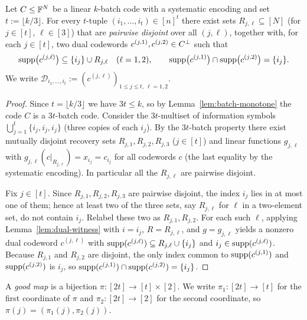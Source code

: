 \begin{lemma}
  \label{lem:dual-pairs}
  Let $C \le \mathbb{F}^N$ be a linear $k$-batch code with a systematic encoding and set
  $t := \lfloor k/3 \rfloor$. For every $t$-tuple $(i_1, \dots, i_t) \in [n]^t$
  there exist sets $R_{j,\ell} \subseteq [N]$ (for $j \in [t]$, $\ell \in [3]$)
  that are \emph{pairwise disjoint} over all $(j,\ell)$, together with, for each
  $j \in [t]$, two dual codewords $c^{(j,1)}, c^{(j,2)} \in C^{\perp}$ such
  that
  \[
    \operatorname{supp}\bigl(c^{(j,\ell)}\bigr) \subseteq \{i_j\} \cup R_{j,\ell}
      \quad(\ell = 1,2),
    \qquad
    \operatorname{supp}\bigl(c^{(j,1)}\bigr) \cap \operatorname{supp}\bigl(c^{(j,2)}\bigr) = \{i_j\}.
  \]
  We write $\mathcal{D}_{i_1, \dots, i_t} := (c^{(j,\ell)})_{1 \le j \le t,\ \ell=1,2}$.
\end{lemma}
\begin{proof}
  Since $t = \lfloor k/3 \rfloor$ we have $3t \le k$, so by
  Lemma~\ref{lem:batch-monotone} the code $C$ is a $3t$-batch code. Consider the
  $3t$-multiset of information symbols $\bigcup_{j=1}^{t} \{i_j, i_j, i_j\}$
  (three copies of each $i_j$). By the $3t$-batch property there exist mutually
  disjoint recovery sets $R_{j,1}, R_{j,2}, R_{j,3}$ ($j \in [t]$) and linear
  functions $g_{j,\ell}$ with $g_{j,\ell}(c|_{R_{j,\ell}}) = x_{i_j} = c_{i_j}$
  for all codewords $c$ (the last equality by the systematic encoding). In
  particular all the $R_{j,\ell}$ are pairwise disjoint.

  Fix $j \in [t]$. Since $R_{j,1}, R_{j,2}, R_{j,3}$ are pairwise disjoint, the
  index $i_j$ lies in at most one of them; hence at least two of the three sets,
  say $R_{j,\ell}$ for $\ell$ in a two-element set, do not contain $i_j$. Relabel
  these two as $R_{j,1}, R_{j,2}$. For each such $\ell$, applying
  Lemma~\ref{lem:dual-witness} with $i = i_j$, $R = R_{j,\ell}$, and $g =
  g_{j,\ell}$ yields a nonzero dual codeword $c^{(j,\ell)}$ with
  $\operatorname{supp}(c^{(j,\ell)}) \subseteq R_{j,\ell} \cup \{i_j\}$ and
  $i_j \in \operatorname{supp}(c^{(j,\ell)})$. Because $R_{j,1}$ and $R_{j,2}$ are disjoint,
  the only index common to $\operatorname{supp}(c^{(j,1)})$ and $\operatorname{supp}(c^{(j,2)})$ is $i_j$, so
  $\operatorname{supp}(c^{(j,1)}) \cap \operatorname{supp}(c^{(j,2)}) = \{i_j\}$.
\end{proof}

\begin{definition}
  \label{def:good-map}
  A \emph{good map} is a bijection $\pi : [2t] \to [t] \times [2]$. We write
  $\pi_1 : [2t] \to [t]$ for the first coordinate of $\pi$ and
  $\pi_2 : [2t] \to [2]$ for the second coordinate, so
  $\pi(j) = (\pi_1(j), \pi_2(j))$.
\end{definition}

